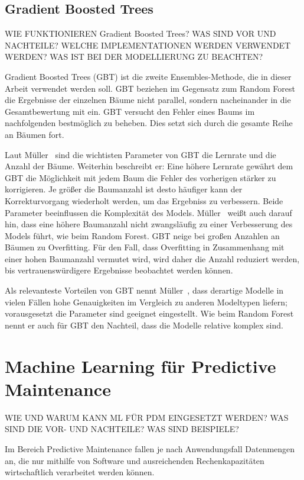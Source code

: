 \subsection{Gradient Boosted Trees}
\label{subsec:gradient_boosted_trees}
WIE FUNKTIONIEREN Gradient Boosted Trees? WAS SIND VOR UND NACHTEILE? WELCHE IMPLEMENTATIONEN WERDEN VERWENDET WERDEN? WAS IST BEI DER MODELLIERUNG ZU BEACHTEN?

Gradient Boosted Trees (GBT) ist die zweite Ensembles-Methode, die in dieser Arbeit verwendet werden soll. GBT beziehen im Gegensatz zum Random Forest die Ergebnisse der einzelnen Bäume nicht parallel, sondern nacheinander in die Gesamtbewertung mit ein. GBT versucht den Fehler eines Baums im nachfolgenden bestmöglich zu beheben. Dies setzt sich durch die gesamte Reihe an Bäumen fort.

Laut Müller~\cite{Muller.2017} sind die wichtisten Parameter von GBT die Lernrate und die Anzahl der Bäume. Weiterhin beschreibt er: Eine höhere Lernrate gewährt dem GBT die Möglichkeit mit jedem Baum die Fehler des vorherigen stärker zu korrigieren. Je größer die Baumanzahl ist desto häufiger kann der Korrekturvorgang wiederholt werden, um das Ergebniss zu verbessern. Beide Parameter beeinflussen die Komplexität des Models. Müller~\cite{Muller.2017} weißt auch darauf hin, dass eine höhere Baumanzahl nicht zwangsläufig zu einer Verbesserung des Models führt, wie beim Random Forest. GBT neige bei großen Anzahlen an Bäumen zu Overfitting. Für den Fall, dass Overfitting in Zusammenhang mit einer hohen Baumanzahl vermutet wird, wird daher die Anzahl reduziert werden, bis vertrauenswürdigere Ergebnisse beobachtet werden können.

Als relevanteste Vorteilen von GBT nennt Müller~\cite{Muller.2017}, dass derartige Modelle in vielen Fällen hohe Genauigkeiten im Vergleich zu anderen Modeltypen liefern; vorausgesetzt die Parameter sind geeignet eingestellt. Wie beim Random Forest nennt er auch für GBT den Nachteil, dass die Modelle relative komplex sind.

\section{Machine Learning für Predictive Maintenance}
\label{sec:machine_learning_fuer_pdm}
WIE UND WARUM KANN ML FÜR PDM EINGESETZT WERDEN? WAS SIND DIE VOR- UND NACHTEILE? WAS SIND BEISPIELE?

Im Bereich Predictive Maintenance fallen je nach Anwendungsfall Datenmengen an, die nur mithilfe von Software und ausreichenden Rechenkapazitäten wirtschaftlich verarbeitet werden können. 

